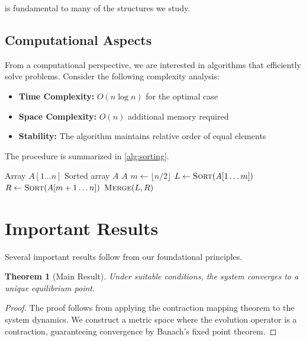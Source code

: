 \documentclass[11pt,twoside,openright]{book}
\theoremstyle{plain}
\newtheorem{theorem}{Theorem}[chapter]
\theoremstyle{definition}
\theoremstyle{remark}
\begin{document}
 is fundamental to many of the structures we study.

\subsection{Computational Aspects}

From a computational perspective, we are interested in algorithms that efficiently solve problems. Consider the following complexity analysis:

\begin{itemize}[itemsep=0.3em]
    \item \textbf{Time Complexity:} $O(n \log n)$ for the optimal case
    \item \textbf{Space Complexity:} $O(n)$ additional memory required
    \item \textbf{Stability:} The algorithm maintains relative order of equal elements
\end{itemize}

The procedure is summarized in \cref{alg:sorting}.

\begin{algorithm}[tbp]
\caption{Example Sorting Procedure}
\label{alg:sorting}
\begin{algorithmic}[1]
\Require Array $A[1 \ldots n]$
\Ensure Sorted array $A$
    \State \Return $A$
\EndIf
\State $m \gets \lfloor n/2 \rfloor$
\State $L \gets \Call{Sort}{A[1 \ldots m]}$
\State $R \gets \Call{Sort}{A[m+1 \ldots n]}$
\State \Return $\Call{Merge}{L, R}$
\end{algorithmic}
\end{algorithm}

\section{Important Results}
\label{sec:fund-results}

Several important results follow from our foundational principles.

\begin{theorem}[Main Result]
\label{thm:main}
Under suitable conditions, the system converges to a unique equilibrium point.
\end{theorem}

\begin{proof}
The proof follows from applying the contraction mapping theorem to the system dynamics. We construct a metric space where the evolution operator is a contraction, guaranteeing convergence by Banach's fixed point theorem.
\end{proof}
\end{document}
